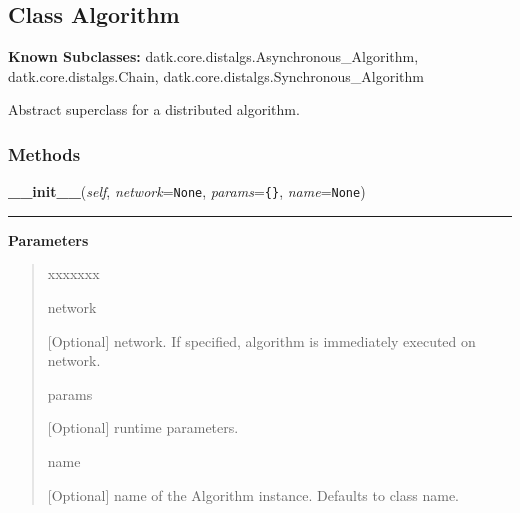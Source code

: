 \subsection{Class Algorithm}

    \label{datk:core:distalgs:Algorithm}
\textbf{Known Subclasses:}
datk.core.distalgs.Asynchronous\_Algorithm,
    datk.core.distalgs.Chain,
    datk.core.distalgs.Synchronous\_Algorithm

Abstract superclass for a distributed algorithm.



  \subsubsection{Methods}

    \label{datk:core:distalgs:Algorithm:__init__}

    \vspace{0.5ex}

\hspace{.8\funcindent}\begin{boxedminipage}{\funcwidth}

    \raggedright \textbf{\_\_init\_\_}(\textit{self}, \textit{network}={\tt None}, \textit{params}={\tt \texttt{\{}\texttt{\}}}, \textit{name}={\tt None})

    \vspace{-1.5ex}

    \rule{\textwidth}{0.5\fboxrule}
\setlength{\parskip}{2ex}
\setlength{\parskip}{1ex}
      \textbf{Parameters}
      \vspace{-1ex}

      \begin{quote}
        \begin{Ventry}{xxxxxxx}

          \item[network]

          [Optional] network. If specified, algorithm is immediately 
          executed on network.

          \item[params]

          [Optional] runtime parameters.

          \item[name]

          [Optional] name of the Algorithm instance. Defaults to class 
          name.

        \end{Ventry}

      \end{quote}

    \end{boxedminipage}

